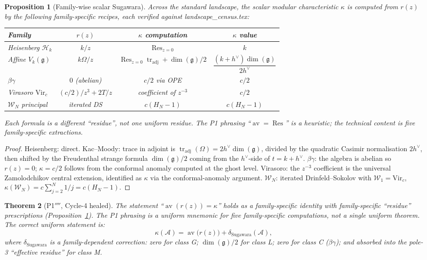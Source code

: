 \documentclass[11pt]{article}
\newtheorem{theorem}{Theorem}
\newtheorem{proposition}[theorem]{Proposition}
\theoremstyle{definition}
\DeclareMathOperator{\av}{av}
\DeclareMathOperator{\tr}{tr}
\DeclareMathOperator{\Res}{Res}
\begin{document}
\begin{proposition}[Family-wise scalar Sugawara]\label{prop:kappa-dict}
Across the standard landscape, the scalar modular characteristic $\kappa$
is computed from $r(z)$ by the following family-specific recipes,
each verified against landscape\_census.tex:
\begin{center}
\renewcommand{\arraystretch}{1.35}
\begin{tabular}{|l|c|c|c|}
\hline
Family & $r(z)$ & $\kappa$ computation & $\kappa$ value \\
\hline
Heisenberg $\mathcal H_k$
 & $k/z$
 & $\Res_{z=0}$
 & $k$ \\
\hline
Affine $V_k(\mathfrak g)$
 & $k\Omega/z$
 & $\Res_{z=0} \tr_{\mathrm{adj}} + \dim(\mathfrak g)/2$
 & $\dfrac{(k+h^\vee)\dim(\mathfrak g)}{2h^\vee}$ \\
\hline
$\beta\gamma$
 & $0$ (abelian)
 & $c/2$ via OPE
 & $c/2$ \\
\hline
Virasoro $\mathrm{Vir}_c$
 & $(c/2)/z^3 + 2T/z$
 & coefficient of $z^{-3}$
 & $c/2$ \\
\hline
$\mathcal W_N$ principal
 & iterated DS
 & $c(H_N - 1)$
 & $c(H_N - 1)$ \\
\hline
\end{tabular}
\end{center}
Each formula is a different ``residue'', not one uniform residue. The
P1 phrasing ``$\av = \Res$'' is a heuristic; the technical content is
five family-specific extractions.
\end{proposition}

\begin{proof}
Heisenberg: direct. Kac--Moody: trace in adjoint is $\tr_{\mathrm{adj}}(\Omega) =
2h^\vee \dim(\mathfrak g)$, divided by the quadratic Casimir normalisation
$2h^\vee$, then shifted by the Freudenthal strange formula $\dim(\mathfrak g)/2$
coming from the $h^\vee$-side of $t = k + h^\vee$. $\beta\gamma$: the
algebra is abelian so $r(z) = 0$; $\kappa = c/2$ follows from the
conformal anomaly computed at the ghost level. Virasoro: the $z^{-3}$
coefficient is the universal Zamolodchikov central extension,
identified as $\kappa$ via the conformal-anomaly argument. $\mathcal W_N$:
iterated Drinfeld--Sokolov with $\mathcal W_1 = \mathrm{Vir}_c$,
$\kappa(\mathcal W_N) = c\sum_{j=2}^N 1/j = c(H_N - 1)$.
\end{proof}

\begin{theorem}[P1$''''$, Cycle-4 healed]\label{thm:p1-cycle4}
The statement ``$\av(r(z)) = \kappa$'' holds as a family-specific
identity with family-specific ``residue'' prescriptions
(Proposition~\ref{prop:kappa-dict}). The P1 phrasing is a \emph{uniform
mnemonic} for five family-specific computations, not a single uniform
theorem. The correct uniform statement is:
\[
\kappa(\mathcal A) = \av\bigl(r(z)\bigr) + \delta_{\mathrm{Sugawara}}(\mathcal A),
\]
where $\delta_{\mathrm{Sugawara}}$ is a family-dependent correction:
zero for class G; $\dim(\mathfrak g)/2$ for class L; zero for class C
($\beta\gamma$); and absorbed into the pole-3 ``effective residue''
for class M.
\end{theorem}
\end{document}
